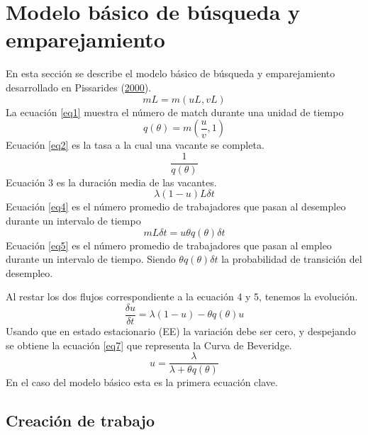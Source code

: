 \documentclass[12pt,oneside]{reedthesis}
\begin{document}
\hypertarget{modelo-buxe1sico-de-buxfasqueda-y-emparejamiento}{%
\section{Modelo básico de búsqueda y emparejamiento}\label{modelo-buxe1sico-de-buxfasqueda-y-emparejamiento}}

En esta sección se describe el modelo básico de búsqueda y emparejamiento desarrollado en Pissarides (\protect\hyperlink{ref-Pissarides2000}{2000}).
\begin{equation} \label{eq1}
mL = m(uL, vL)
\end{equation}
La ecuación \eqref{eq1} muestra el número de match durante una unidad de tiempo
\begin{equation} \label{eq2}
q(\theta) = m(\frac{u}{v}, 1)
\end{equation}
Ecuación \eqref{eq2} es la tasa a la cual una vacante se completa.
\begin{equation} \label{eq3}
\frac{1}{q(\theta)}
\end{equation}
Ecuación 3 es la duración media de las vacantes.
\begin{equation} \label{eq4}
\lambda(1-u)L\delta t
\end{equation}
Ecuación \eqref{eq4} es el número promedio de trabajadores que pasan al desempleo durante un intervalo de tiempo
\begin{equation} \label{eq5}
mL\delta t = u\theta q(\theta)\delta t
\end{equation}
Ecuación \eqref{eq5} es el número promedio de trabajadores que pasan al empleo durante un intervalo de tiempo. Siendo \(\theta q(\theta)\delta t\) la probabilidad de transición del desempleo.

Al restar los dos flujos correspondiente a la ecuación 4 y 5, tenemos la evolución.
\begin{equation} \label{eq6}
\frac{\delta u}{\delta t} = \lambda(1-u)-\theta q(\theta)u
\end{equation}
Usando que en estado estacionario (EE) la variación debe ser cero, y despejando se obtiene la ecuación \eqref{eq7} que representa la Curva de Beveridge.
\begin{equation} \label{eq7}
u = \frac{\lambda}{\lambda+\theta q(\theta)}
\end{equation}
En el caso del modelo básico esta es la primera ecuación clave.

\subsection{Creación de trabajo}
\end{document}
